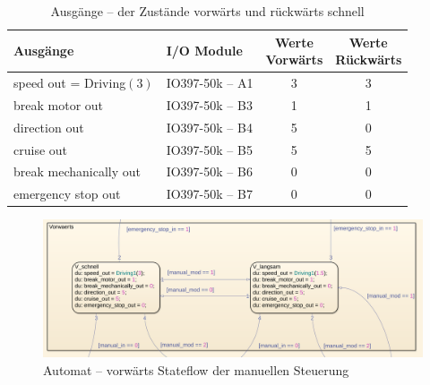 \pagebreak[1]
\begin{table}[!ht]
	\centering
	\caption{Ausgänge – der Zustände vorwärts und rückwärts schnell}
	\label{Automat_man:tab:z_V_schnell}
	\begin{tabular}{llcc}
		\hline
		\textbf{Ausgänge}                             & \textbf{I/O Module}                 & \makecell{\textbf{Werte}     \\ \textbf{Vorwärts}} & \makecell{\textbf{Werte}     \\ \textbf{Rückwärts}} \\ \hline
		\multicolumn{1}{l|}{speed out = Driving$(3)$} & \multicolumn{1}{l|}{IO397-50k – A1} & 3                        & 3 \\
		\multicolumn{1}{l|}{break motor out}          & \multicolumn{1}{l|}{IO397-50k – B3} & 1                        & 1 \\
		\multicolumn{1}{l|}{direction out}            & \multicolumn{1}{l|}{IO397-50k – B4} & 5                        & 0 \\
		\multicolumn{1}{l|}{cruise out}               & \multicolumn{1}{l|}{IO397-50k – B5} & 5                        & 5 \\
		\multicolumn{1}{l|}{break mechanically out}   & \multicolumn{1}{l|}{IO397-50k – B6} & 0                        & 0 \\
		\multicolumn{1}{l|}{emergency stop out}       & \multicolumn{1}{l|}{IO397-50k – B7} & 0                        & 0 \\ \hline
	\end{tabular}
\end{table}
\pagebreak[1]

\pagebreak[1]
\begin{figure}[!ht]
	\begin{center}
		\includegraphics[width=\textwidth]{img/5_simulation/Automat_man_vorwaerts.png}
		\caption{Automat – vorwärts Stateflow der manuellen Steuerung}
		\label{Automat_man:img:man_vorwärts}
	\end{center}
\end{figure}
\pagebreak[1]



